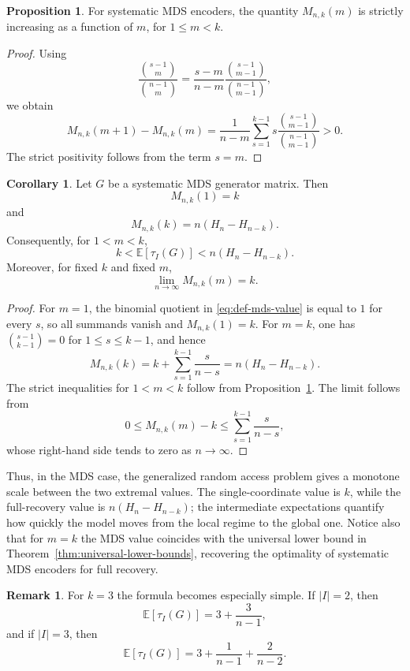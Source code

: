 \documentclass[11pt,a4paper]{article}
\numberwithin{equation}{section}
\theoremstyle{definition}
\newtheorem{remark}[definition]{Remark}
\theoremstyle{definition}
\newtheorem{proposition}[definition]{Proposition}
\newtheorem{corollary}[definition]{Corollary}
\newcommand{\E}{\mathbb{E}}
\begin{document}
\begin{proposition}\label{prop:mds-monotone}
For systematic MDS encoders, the quantity $M_{n,k}(m)$ is strictly increasing as a function of $m$, for $1\leq m<k$.
\end{proposition}

\begin{proof}
Using
\[
\frac{\binom{s-1}{m}}{\binom{n-1}{m}}
=\frac{s-m}{n-m}\frac{\binom{s-1}{m-1}}{\binom{n-1}{m-1}},
\]
we obtain
\[
M_{n,k}(m+1)-M_{n,k}(m)
=\frac{1}{n-m}\sum_{s=1}^{k-1}s\frac{\binom{s-1}{m-1}}{\binom{n-1}{m-1}}>0.
\]
The strict positivity follows from the term $s=m$.
\end{proof}

\begin{corollary}\label{cor:mds-extremes}
Let $G$ be a systematic MDS generator matrix.  Then
\[
M_{n,k}(1)=k
\]
and
\[
M_{n,k}(k)=n(H_n-H_{n-k}).
\]
Consequently, for $1<m<k$,
\[
k<\E[\tau_I(G)]<n(H_n-H_{n-k}).
\]
Moreover, for fixed $k$ and fixed $m$,
\[
\lim_{n\to\infty}M_{n,k}(m)=k.
\]
\end{corollary}

\begin{proof}
For $m=1$, the binomial quotient in \eqref{eq:def-mds-value} is equal to $1$ for every $s$, so all summands vanish and $M_{n,k}(1)=k$.  For $m=k$, one has $\binom{s-1}{k-1}=0$ for $1\leq s\leq k-1$, and hence
\[
M_{n,k}(k)=k+\sum_{s=1}^{k-1}\frac{s}{n-s}=n(H_n-H_{n-k}).
\]
The strict inequalities for $1<m<k$ follow from Proposition~\ref{prop:mds-monotone}.  The limit follows from
\[
0\leq M_{n,k}(m)-k\leq \sum_{s=1}^{k-1}\frac{s}{n-s},
\]
whose right-hand side tends to zero as $n\to\infty$.
\end{proof}

Thus, in the MDS case, the generalized random access problem gives a monotone scale between the two extremal values.  The single-coordinate value is $k$, while the full-recovery value is $n(H_n-H_{n-k})$; the intermediate expectations quantify how quickly the model moves from the local regime to the global one.  Notice also that for $m=k$ the MDS value coincides with the universal lower bound in Theorem~\ref{thm:universal-lower-bounds}, recovering the optimality of systematic MDS encoders for full recovery.

\begin{remark}
For $k=3$ the formula becomes especially simple.  If $|I|=2$, then
\begin{equation}\label{eq:mds-k3-m2}
\E[\tau_I(G)]=3+\frac{3}{n-1},
\end{equation}
and if $|I|=3$, then
\begin{equation}\label{eq:mds-k3-m3}
\E[\tau_I(G)]=3+\frac{1}{n-1}+\frac{2}{n-2}.
\end{equation}
\end{remark}
\end{document}
